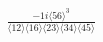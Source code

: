 \documentclass[varwidth, border=5pt]{standalone}
\begin{document}
\begin{my}
$\begin{gathered}
\scriptscriptstyle\frac{-1i⟨56⟩^3}{⟨12⟩⟨16⟩⟨23⟩⟨34⟩⟨45⟩}
\end{gathered}$
\end{my}
\end{document}
